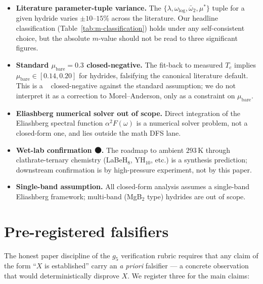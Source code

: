 \documentclass[11pt,a4paper]{article}
\providecommand{\tierOrange}{🟠}
\providecommand{\tierRed}{🔴}
\begin{document}
\begin{itemize}\itemsep0.3em
\item \textbf{Literature parameter-tuple variance.} The
$\{\lambda,\omega_{\log},\bar\omega_2,\mu^*\}$ tuple for a given
hydride varies $\pm 10$--$15\%$ across the literature. Our headline
classification (Table~\ref{tab:m-classification}) holds under any
self-consistent choice, but the absolute $m$-value should not be
read to three significant figures.

\item \textbf{Standard $\mu_{\text{bare}}=0.3$ closed-negative.}
The fit-back to measured $T_c$ implies
$\mu_{\text{bare}}\in[0.14,0.20]$ for hydrides, falsifying the
canonical literature default. This is a \tierRed\ closed-negative
against the standard assumption; we do not interpret it as a
correction to Morel--Anderson, only as a constraint on
$\mu_{\text{bare}}$.

\item \textbf{Eliashberg numerical solver out of scope.} Direct
integration of the Eliashberg spectral function $\alpha^2 F(\omega)$
is a numerical solver problem, not a closed-form one, and lies
outside the math DFS lane.

\item \textbf{Wet-lab confirmation \tierOrange.} The roadmap to
ambient $293$\,K through clathrate-ternary chemistry (LaBeH$_8$, YH$_{10}$,
etc.) is a synthesis prediction; downstream confirmation is by
high-pressure experiment, not by this paper.

\item \textbf{Single-band assumption.} All closed-form analysis assumes
a single-band Eliashberg framework; multi-band (MgB$_2$ type)
hydrides are out of scope.
\end{itemize}

\section{Pre-registered falsifiers}
\label{sec:falsifiers}

The honest paper discipline of the $g_5$ verification rubric requires
that any claim of the form ``$X$ is established'' carry an
\emph{a priori} falsifier --- a concrete observation that would
deterministically disprove $X$. We register three for the main claims:
\end{document}
